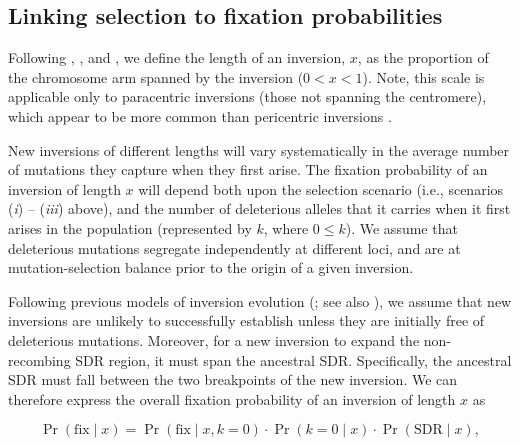 \documentclass{article}
\begin{document}
\subsection*{Linking selection to fixation probabilities}

Following \citet{vanValenLevins1968}, \citet{Santos1986}, and \citet{ConnallonOlito2020}, we define the length of an inversion, $x$, as the proportion of the chromosome arm spanned by the inversion ($0 < x < 1$). Note, this scale is applicable only to paracentric inversions (those not spanning the centromere), which appear to be more common than pericentric inversions \citep{WellenreutherBernatchez2018}.

New inversions of different lengths will vary systematically in the average number of mutations they capture when they first arise. The fixation probability of an inversion of length $x$ will depend both upon the selection scenario (i.e., scenarios ({\itshape i}) -- ({\itshape iii}) above), and the number of deleterious alleles that it carries when it first arises in the population (represented by $k$, where $0 \leq k$). We assume that deleterious mutations segregate independently at different loci, and are at mutation-selection balance prior to the origin of a given inversion. 

Following previous models of inversion evolution (\citealt{Nei1967, Santos1986, Connallon2018}; see also \citealt{OrrKim1998}), we assume that new inversions are unlikely to successfully establish unless they are initially free of deleterious mutations. Moreover, for a new inversion to expand the non-recombing SDR region, it must span the ancestral SDR. Specifically, the ancestral SDR must fall between the two breakpoints of the new inversion. We can therefore express the overall fixation probability of an inversion of length $x$ as

\begin{equation}\label{eq:generalPrFix}
	\Pr(\text{fix} \mid x) = \Pr(\text{fix} \mid x, k=0) \cdot \Pr(k = 0 \mid x) \cdot \Pr(\text{SDR} \mid x),
\end{equation}
\end{document}
